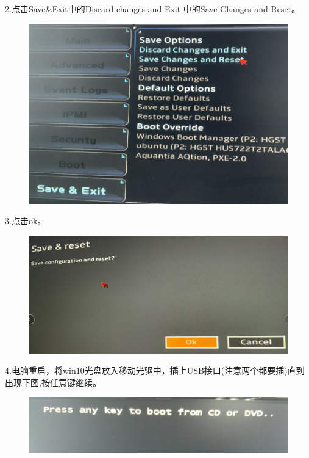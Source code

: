 \documentclass[openbib]{article}
\begin{document}
2.点击Save\&Exit中的Discard changes and Exit 中的Save Changes and Reset。
\begin{figure}[htbp]
	\centering
	\includegraphics[scale=0.3]{2}
\end{figure}

3.点击ok。
\begin{figure}[htbp]
	\centering
	\includegraphics[scale=0.24]{3}
\end{figure}

4.电脑重启，将win10光盘放入移动光驱中，插上USB接口(注意两个都要插)直到出现下图,按任意键继续。
\begin{figure}[htbp]
	\centering
	\includegraphics[scale=0.3]{4}
\end{figure}
\end{document}
